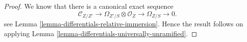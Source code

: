 \documentclass[10pt,a4paper]{amsart}
\theoremstyle{plain}
\theoremstyle{definition}
\theoremstyle{remark}
\numberwithin{equation}{subsection}
\begin{document}
\begin{proof}
We know that there is a canonical exact sequence
$$
\mathcal{C}_{Z/Z'} \to
\Omega_{Z'/S} \otimes \mathcal{O}_Z \to
\Omega_{Z/S} \to 0.
$$
see
Lemma \ref{lemma-differentials-relative-immersion}.
Hence the result follows on applying
Lemma \ref{lemma-differentials-universally-unramified}.
\end{proof}
\end{document}
